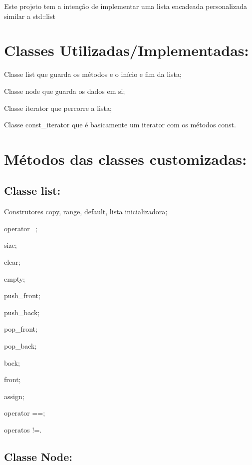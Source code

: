 Este projeto tem a intenção de implementar uma lista encadeada personalizada similar a std\+::list

\section*{Classes Utilizadas/\+Implementadas\+:}


\begin{DoxyItemize}
\item Classe list que guarda os métodos e o início e fim da lista;
\item Classe node que guarda os dados em si;
\item Classe iterator que percorre a lista;
\item Classe const\+\_\+iterator que é basicamente um iterator com os métodos const.
\end{DoxyItemize}

\section*{Métodos das classes customizadas\+:}

\subsection*{Classe list\+:}


\begin{DoxyItemize}
\item Construtores copy, range, default, lista inicializadora;
\item operator=;
\item size;
\item clear;
\item empty;
\item push\+\_\+front;
\item push\+\_\+back;
\item pop\+\_\+front;
\item pop\+\_\+back;
\item back;
\item front;
\item assign;
\item operator ==;
\item operatos !=.
\end{DoxyItemize}

\subsection*{Classe Node\+:}


